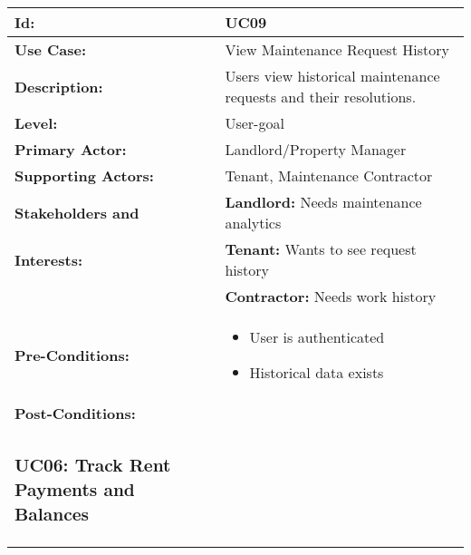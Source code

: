 \documentclass[12pt]{article}
\begin{document}
\begin{tabular}{|p{3cm}|p{11cm}|}
\hline
\textbf{Id:} & UC09 \\
\hline
\textbf{Use Case:} & View Maintenance Request History \\
\hline
\textbf{Description:} & Users view historical maintenance requests and their resolutions. \\
\hline
\textbf{Level:} & User-goal \\
\hline
\textbf{Primary Actor:} & Landlord/Property Manager \\
\hline
\textbf{Supporting Actors:} & Tenant, Maintenance Contractor \\
\hline
\textbf{Stakeholders and} & \textbf{Landlord:} Needs maintenance analytics \\
\textbf{Interests:} & \textbf{Tenant:} Wants to see request history \\
& \textbf{Contractor:} Needs work history \\
\hline
\textbf{Pre-Conditions:} & 
\begin{itemize}
    \item User is authenticated
    \item Historical data exists
\end{itemize} \\
\hline
\textbf{Post-Conditions:} & \\


\subsubsection{UC06: Track Rent Payments and Balances}


\end{tabular}
\end{document}
